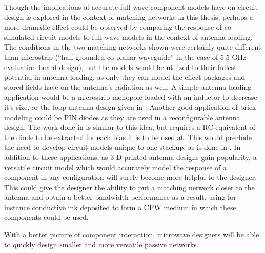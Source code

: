 \documentclass[12pt]{usfcoe}
\newcommand{\usfpagebreak}{\pagebreak\vspace*{0.5in}}
\begin{document}
    \indent Though the implications of accurate full-wave component models have on circuit design is explored in the context of matching networks in this thesis, perhaps a more dramatic effect could be observed by comparing the response of  co-simulated circuit models to full-wave models in the context of antenna loading.
    The conditions in the two matching networks shown were certainly quite different than microstrip (``half grounded co-planar waveguide'' in the case of 5.5 GHz evaluation board design), but the models would be utilized to their fullest potential in antenna loading, as only they can model the effect packages and stored fields have on the antenna's radiation as well.  
    A simple antenna loading application would be a microstrip monopole loaded with an inductor to decrease it's size, or the loop antenna design given in \cite{mumcuCapacitors}. 
    Another good application of brick modeling could be PIN diodes as they are used in a reconfigurable antenna design. 
    The work done in \cite{brick_diode} is similar to this idea, but requires a RC equivalent of the diode to be extracted for each bias it is to be used at.
    This would preclude the need to develop circuit models unique to one stackup, as is done in \cite{pin_diode_ckt}.
    In addition to these applications, as 3-D printed antenna designs gain popularity, a versatile circuit model which would accurately model the response of a component in any configuration will surely become more helpful to the designer.
    This could give the designer the ability to put a matching network closer to the antenna and obtain a better bandwidth performance as a result, using for instance conductive ink deposited to form a CPW medium in which these components could be used. 
    
    With a better picture of component interaction, microwave designers will be able to quickly design smaller and more versatile passive networks.


\usfpagebreak
{}



\end{document}
